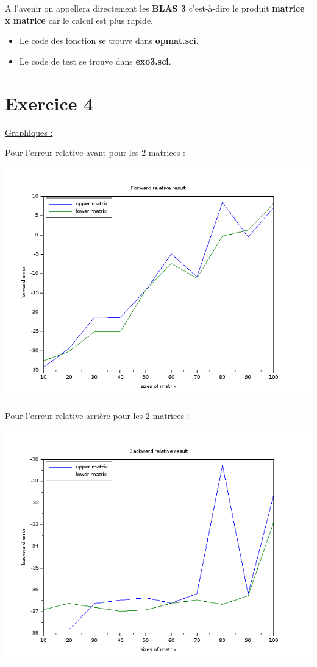 \documentclass[12pt, letterpaper]{article}
\begin{document}
A l'avenir on appellera directement les \textbf{BLAS 3} c'est-à-dire
le produit \textbf{matrice x matrice} car le calcul est plus rapide.

\begin{itemize}
\item Le code des fonction se trouve dans \textbf{opmat.sci}.
\item Le code de test se trouve dans \textbf{exo3.sci}.
\end{itemize}

\section*{Exercice 4}

\underline{Graphiques :} \newline

Pour l'erreur relative avant pour les 2 matrices :

\includegraphics[scale=0.5]{img/ferrorb.png}

Pour l'erreur relative arrière pour les 2 matrices :

\includegraphics[scale=0.5]{img/berrorb.png}
\end{document}
